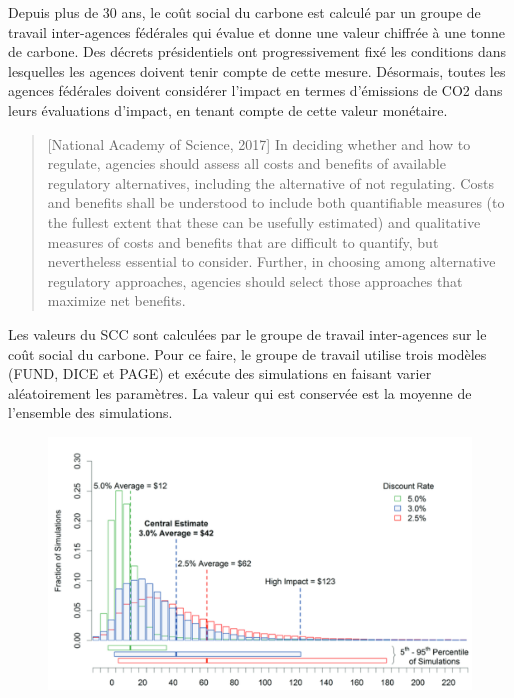 Depuis plus de 30 ans, le coût social du carbone est calculé par un groupe de travail inter-agences fédérales qui évalue et donne une valeur chiffrée à une tonne de carbone. Des décrets présidentiels ont progressivement fixé les conditions dans lesquelles les agences doivent tenir compte de cette mesure. Désormais, toutes les agences fédérales doivent considérer l'impact en termes d’émissions de CO2 dans leurs évaluations d'impact, en tenant compte de cette valeur monétaire. \\

\begin{quote}[National Academy of Science, 2017]
     In deciding whether and how to regulate, agencies should assess all costs and benefits of available regulatory alternatives, including the alternative of not regulating. Costs and benefits shall be understood to include both quantifiable measures (to the fullest extent that these can be usefully estimated) and qualitative measures of costs and benefits that are difficult to quantify, but nevertheless essential to consider. Further, in choosing among alternative regulatory approaches, agencies should select those approaches that maximize net benefits. 
\end{quote}

Les valeurs du SCC sont calculées par le groupe de travail inter-agences sur le coût social du carbone. Pour ce faire, le groupe de travail utilise trois modèles (FUND, DICE et PAGE) et exécute des simulations en faisant varier aléatoirement les paramètres. La valeur qui est conservée est la moyenne de l'ensemble des simulations. 

\begin{figure}
    \centering
    \includegraphics[width=0.9\linewidth]{figures/scc.png}
    \label{fig:scc}
\end{figure}

